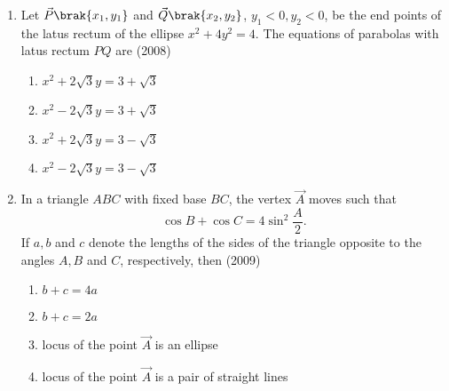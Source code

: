 \begin{enumerate}[label=\thesubsection.\arabic*.,ref=\thesubsection.\theenumi]
\item Let $\vec{P}\brak{x_{1}, y_{1}}$ and $\vec{Q}\brak{x_{2},y_{2}}$, $y_{1}<0,y_{2}<0$, be the end points of the latus rectum of the ellipse $x^2+4y^2=4$. The equations of parabolas with latus rectum ${PQ}$ are \hfill(2008)
	\begin{multicols}{2}
	\begin{enumerate}
		\item $x^2+2\sqrt{3}y=3+\sqrt{3}$
		\item $x^2-2\sqrt{3}y=3+\sqrt{3}$
			\columnbreak
		\item $x^2+2\sqrt{3}y=3-\sqrt{3}$
		\item $x^2-2\sqrt{3}y=3-\sqrt{3}$
	\end{enumerate}\end{multicols}

\item In a triangle ${ABC}$ with fixed base ${BC}$, the vertex $\vec{A}$ moves such that
	$$\cos{B}+\cos{C}=4\sin^2{\frac{A}{2}}.$$
		If $a,b$ and $c$ denote the lengths of the sides of the triangle opposite to the angles $A,B$ and $C$, respectively, then \hfill(2009)\\
		\begin{enumerate}
			\item $b+c=4a$
			\item $b+c=2a$
			\item locus of the point $\vec{A}$ is an ellipse
			\item locus of the point $\vec{A}$ is a pair of straight lines
		\end{enumerate}


\end{enumerate}
